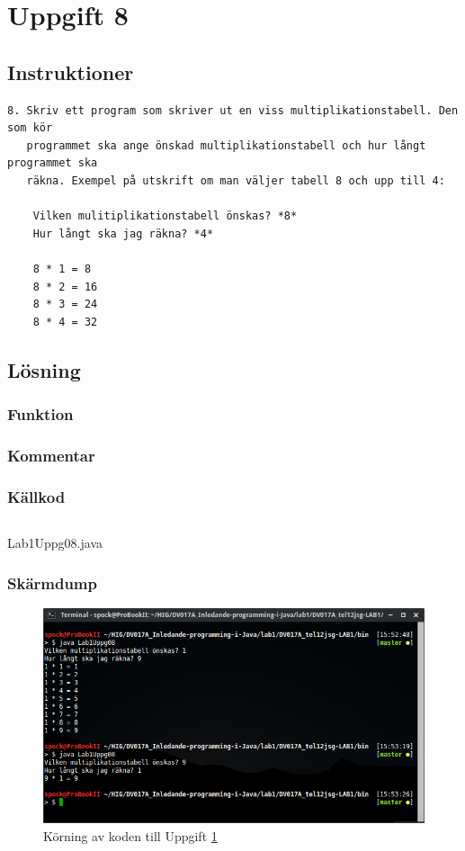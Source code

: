 \section{Uppgift 8}\label{uppgift-8}

\subsection{Instruktioner}
\begin{verbatim}
8. Skriv ett program som skriver ut en viss multiplikationstabell. Den som kör
   programmet ska ange önskad multiplikationstabell och hur långt programmet ska
   räkna. Exempel på utskrift om man väljer tabell 8 och upp till 4:

    Vilken mulitiplikationstabell önskas? *8*
    Hur långt ska jag räkna? *4*

    8 * 1 = 8
    8 * 2 = 16
    8 * 3 = 24
    8 * 4 = 32
\end{verbatim}

\subsection{Lösning}
\subsubsection{Funktion}
\subsubsection{Kommentar}

\subsubsection{Källkod}\label{uppgift-8_src}
    \inputminted[linenos]{java}{src/Lab1Uppg08.java}
    \caption{Lab1Uppg08.java}
    \label{Uppg8src}

\subsubsection{Skärmdump}
\begin{figure}[htbp]
    \centering
        \includegraphics[width=\linewidth]{img/08.png}
    \caption{Körning av koden till Uppgift \ref{uppgift-8}}
    \label{fig:screenshot-08}
\end{figure}
